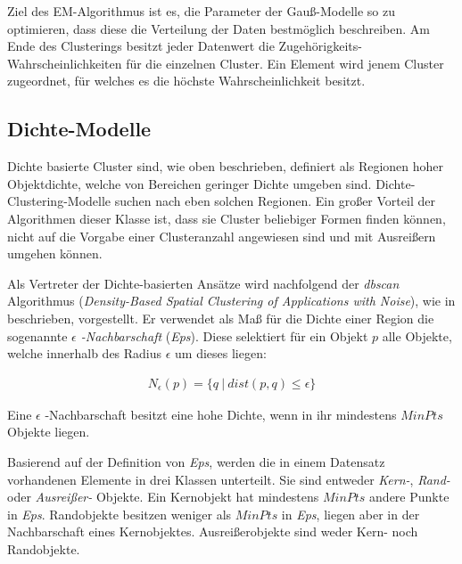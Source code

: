 Ziel des EM-Algorithmus ist es, die Parameter der Gauß-Modelle so zu optimieren, dass diese die Verteilung der Daten bestmöglich beschreiben.
Am Ende des Clusterings besitzt jeder Datenwert die Zugehörigkeits-Wahrscheinlichkeiten für die einzelnen Cluster.
Ein Element wird jenem Cluster zugeordnet, für welches es die höchste Wahrscheinlichkeit besitzt.

\subsection{Dichte-Modelle}
\label{sec:grund_density_clustering}

Dichte basierte Cluster sind, wie oben beschrieben, definiert als Regionen hoher Objektdichte, welche
von Bereichen geringer Dichte umgeben sind. Dichte-Clustering-Modelle suchen nach eben solchen Regionen.
Ein großer Vorteil der Algorithmen dieser Klasse ist, dass sie Cluster beliebiger Formen finden können,
nicht auf die Vorgabe einer Clusteranzahl angewiesen sind und mit Ausreißern umgehen können.

Als Vertreter der Dichte-basierten Ansätze wird nachfolgend der \textit{\acrshort*{dbscan}} Algorithmus
(\textit{Density-Based Spatial Clustering of Applications with Noise}), wie in \cite[]{Gao2012} beschrieben, vorgestellt.
Er verwendet als Maß für die Dichte einer Region die sogenannte \textit{$\epsilon$ -Nachbarschaft} (\textit{Eps}).
Diese selektiert für ein Objekt $p$ alle Objekte, welche innerhalb des Radius $\epsilon$ um dieses liegen:

\begin{ceqn}
\begin{align}
    \label{eq_dbscan_1}
    N_{\epsilon}(p) = \{ q\ |\ dist(p,q) \leq \epsilon \}
\end{align}
\end{ceqn}

Eine $\epsilon$ -Nachbarschaft besitzt eine hohe Dichte, wenn in ihr mindestens $MinPts$ Objekte liegen.

Basierend auf der Definition von \textit{Eps}, werden die in einem Datensatz vorhandenen Elemente in
drei Klassen unterteilt. Sie sind entweder \textit{Kern-}, \textit{Rand-} oder \textit{Ausreißer-} Objekte.
Ein Kernobjekt hat mindestens $MinPts$ andere Punkte in \textit{Eps}.
Randobjekte besitzen weniger als $MinPts$ in \textit{Eps}, liegen aber in der Nachbarschaft eines Kernobjektes.
Ausreißerobjekte sind weder Kern- noch Randobjekte.

